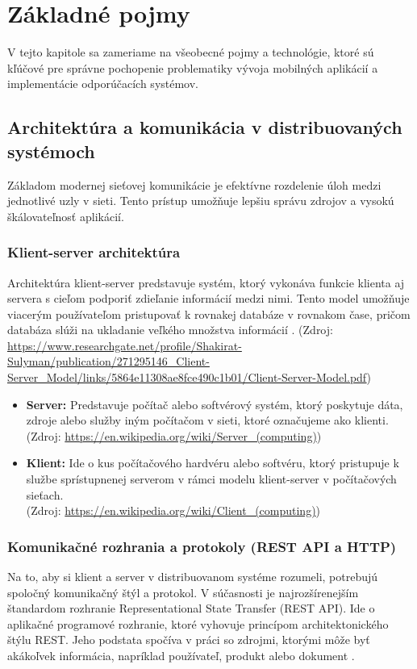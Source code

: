 


\section{Základné pojmy}
V tejto kapitole sa zameriame na všeobecné pojmy a technológie, 
ktoré sú kľúčové pre správne pochopenie problematiky vývoja mobilných aplikácií a implementácie odporúčacích systémov.

\iffalse
\subsection{Architektúra a komunikácia v distribuovaných systémoch}
Základom modernej sieťovej komunikácie je efektívne rozdelenie úloh medzi jednotlivé uzly v sieti. Tento prístup umožňuje lepšiu správu zdrojov a vysokú škálovateľnosť aplikácií.


\subsubsection{Klient-server architektúra}
Architektúra klient-server predstavuje systém, ktorý vykonáva funkcie klienta aj servera s cieľom podporiť zdieľanie informácií medzi nimi. Tento model umožňuje viacerým používateľom pristupovať k rovnakej databáze v rovnakom čase, pričom databáza slúži na ukladanie veľkého množstva informácií \cite{sulyman2014}.
(Zdroj: \url{https://www.researchgate.net/profile/Shakirat-Sulyman/publication/271295146_Client-Server_Model/links/5864e11308ae8fce490c1b01/Client-Server-Model.pdf})

\begin{itemize}
    \item \textbf{Server:} Predstavuje počítač alebo softvérový systém, ktorý poskytuje dáta, zdroje alebo služby iným počítačom v sieti, ktoré označujeme ako klienti. \\ (Zdroj: \url{https://en.wikipedia.org/wiki/Server_(computing)})
    \item \textbf{Klient:} Ide o kus počítačového hardvéru alebo softvéru, ktorý pristupuje k službe sprístupnenej serverom v rámci modelu klient-server v počítačových sieťach. \\ (Zdroj: \url{https://en.wikipedia.org/wiki/Client_(computing)})
\end{itemize}


\subsubsection{Komunikačné rozhrania a protokoly (REST API a HTTP)}
Na to, aby si klient a server v distribuovanom systéme rozumeli, potrebujú spoločný komunikačný štýl a protokol. V súčasnosti je najrozšírenejším štandardom rozhranie \foreignlanguage{english}{Representational State Transfer} (REST API). Ide o aplikačné programové rozhranie, ktoré vyhovuje princípom architektonického štýlu REST. Jeho podstata spočíva v práci so zdrojmi, ktorými môže byť akákoľvek informácia, napríklad používateľ, produkt alebo dokument \cite{google_cloud_rest}.

